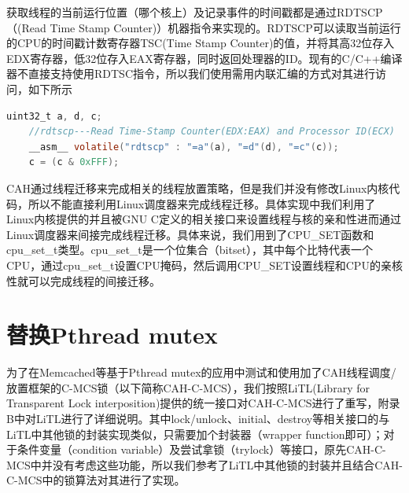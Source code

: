 获取线程的当前运行位置（哪个核上）及记录事件的时间戳都是通过RDTSCP（(Read Time Stamp Counter)）机器指令来实现的。RDTSCP可以读取当前运行的CPU的时间戳计数寄存器TSC(Time Stamp Counter)的值，并将其高32位存入EDX寄存器，低32位存入EAX寄存器，同时返回处理器的ID。现有的C/C++编译器不直接支持使用RDTSC指令，所以我们使用需用内联汇编的方式对其进行访问，如下所示
\begin{lstlisting}[language={C}, caption={通过内联汇编来使用RDTSCP指令}]
    uint32_t a, d, c;
    //rdtscp---Read Time-Stamp Counter(EDX:EAX) and Processor ID(ECX)
    __asm__ volatile("rdtscp" : "=a"(a), "=d"(d), "=c"(c));
    c = (c & 0xFFF);
\end{lstlisting}

CAH通过线程迁移来完成相关的线程放置策略，但是我们并没有修改Linux内核代码，所以不能直接利用Linux调度器来完成线程迁移。具体实现中我们利用了Linux内核提供的并且被GNU C定义的相关接口来设置线程与核的亲和性进而通过Linux调度器来间接完成线程迁移。具体来说，我们用到了CPU\_SET函数和cpu\_set\_t类型。cpu\_set\_t是一个位集合（bitset），其中每个比特代表一个CPU，通过cpu\_set\_t设置CPU掩码，然后调用CPU\_SET设置线程和CPU的亲核性就可以完成线程的间接迁移。

\section{替换Pthread mutex}
为了在Memcached等基于Pthread mutex的应用中测试和使用加了CAH线程调度/放置框架的C-MCS锁（以下简称CAH-C-MCS），我们按照LiTL\cite{guiroux2016multicore}(Library for Transparent Lock interposition)提供的统一接口对CAH-C-MCS进行了重写，附录B中对LiTL进行了详细说明。其中lock/unlock、initial、destroy等相关接口的与LiTL中其他锁的封装实现类似，只需要加个封装器（wrapper function即可）；对于条件变量（condition variable）及尝试拿锁（trylock）等接口，原先CAH-C-MCS中并没有考虑这些功能，所以我们参考了LiTL中其他锁的封装并且结合CAH-C-MCS中的锁算法对其进行了实现。

